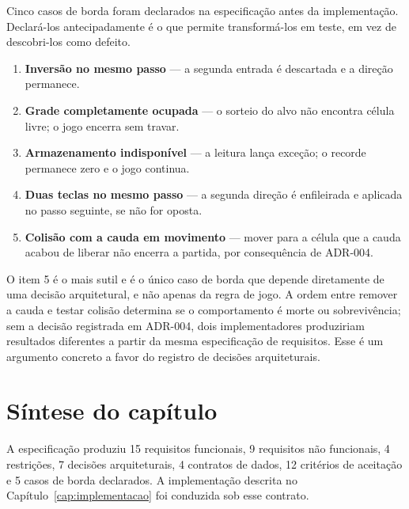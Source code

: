 Cinco casos de borda foram declarados na especificação antes da implementação.
Declará-los antecipadamente é o que permite transformá-los em teste, em vez de
descobri-los como defeito.

\begin{enumerate}
	\item \textbf{Inversão no mesmo passo} --- a segunda entrada é descartada e a direção permanece.
	\item \textbf{Grade completamente ocupada} --- o sorteio do alvo não encontra célula livre; o jogo encerra sem travar.
	\item \textbf{Armazenamento indisponível} --- a leitura lança exceção; o recorde permanece zero e o jogo continua.
	\item \textbf{Duas teclas no mesmo passo} --- a segunda direção é enfileirada e aplicada no passo seguinte, se não for oposta.
	\item \textbf{Colisão com a cauda em movimento} --- mover para a célula que a cauda acabou de liberar não encerra a partida, por consequência de ADR-004.
\end{enumerate}

O item 5 é o mais sutil e é o único caso de borda que depende diretamente de uma
decisão arquitetural, e não apenas da regra de jogo. A ordem entre remover a
cauda e testar colisão determina se o comportamento é morte ou sobrevivência;
sem a decisão registrada em ADR-004, dois implementadores produziriam resultados
diferentes a partir da mesma especificação de requisitos. Esse é um argumento
concreto a favor do registro de decisões arquiteturais.

\section{Síntese do capítulo}
\label{sec:esp-sintese}

A especificação produziu 15 requisitos funcionais, 9 requisitos não funcionais,
4 restrições, 7 decisões arquiteturais, 4 contratos de dados, 12 critérios de
aceitação e 5 casos de borda declarados. A implementação descrita no
Capítulo~\ref{cap:implementacao} foi conduzida sob esse contrato.
